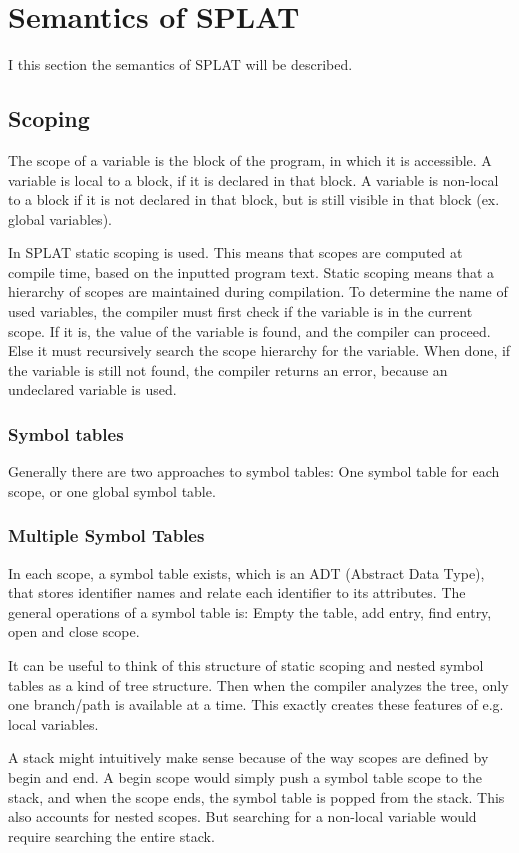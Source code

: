 \section{Semantics of SPLAT}
I this section the semantics of SPLAT will be described. 

\subsection{Scoping}
The scope of a variable is the block of the program, in which it is accessible. A variable is local to a block, if it is declared in that block. A variable is non-local to a block if it is not declared in that block, but is still visible in that block (ex. global variables).

In SPLAT static scoping is used. This means that scopes are computed at compile time, based on the inputted program text. Static scoping means that a hierarchy of scopes are maintained during compilation.  To determine the name of used variables, the compiler  must first check if the variable is in the current scope. If it is, the value of the variable is found, and the compiler can proceed. Else it must recursively search the scope hierarchy for the variable. When done, if the variable is still not found, the compiler returns an error, because an undeclared variable is used. 
\subsubsection{Symbol tables}
Generally there are two approaches to symbol tables: One symbol table for each scope, or one global symbol table.
\subsubsection*{Multiple Symbol Tables}
In each scope, a symbol table exists, which is an ADT (Abstract Data Type), that stores identifier names and relate each identifier to its attributes. The general operations of a symbol table is: Empty the table, add entry, find entry, open and close scope. 

It can be useful to think of this structure of static scoping and nested symbol tables as a kind of tree structure. Then when the compiler analyzes the tree, only one branch/path is available at a time. This exactly creates these features of e.g. local variables.

A stack might intuitively make sense because of the way scopes are defined by begin and end. A begin scope would simply push a symbol table scope to the stack, and when the scope ends, the symbol table is popped from the stack. This also accounts for nested scopes. But searching for a non-local variable would require searching the entire stack. 

